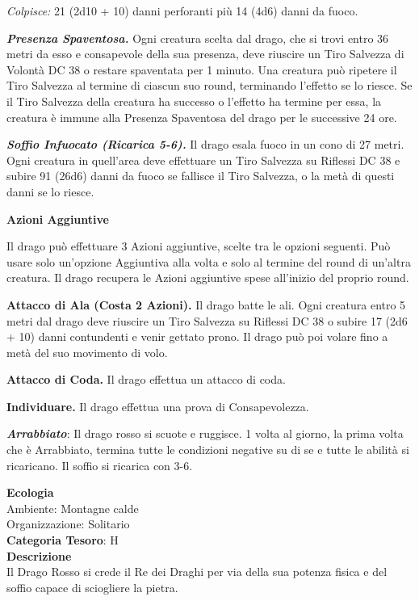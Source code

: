 \begin{multicols}{2}
{\emph{Colpisce:} 21 (2d10 + 10) danni perforanti più 14 (4d6) danni da fuoco.

\emph{\textbf{Presenza Spaventosa.}} Ogni creatura scelta dal drago, che si trovi entro 36 metri da esso e consapevole della sua presenza, deve riuscire un Tiro Salvezza di Volontà DC 38 o restare spaventata per 1 minuto. Una creatura può ripetere il Tiro Salvezza al termine di ciascun suo round, terminando l'effetto se lo riesce. Se il Tiro Salvezza della creatura ha successo o l'effetto ha termine per essa, la creatura è immune alla Presenza Spaventosa del drago per le successive 24 ore.

\emph{\textbf{Soffio Infuocato (Ricarica 5-6).}} Il drago esala fuoco in un cono di 27 metri. Ogni creatura in quell'area deve effettuare un Tiro Salvezza su Riflessi DC 38 e subire 91 (26d6) danni da fuoco se fallisce il Tiro Salvezza, o la metà di questi danni se lo riesce.

\textbf{Azioni Aggiuntive}

Il drago può effettuare 3 Azioni aggiuntive, scelte tra le opzioni seguenti. Può usare solo un'opzione Aggiuntiva alla volta e solo al termine del round di un'altra creatura. Il drago recupera le Azioni aggiuntive spese all'inizio del proprio round.

\textbf{Attacco di Ala (Costa 2 Azioni).} Il drago batte le ali. Ogni creatura entro 5 metri dal drago deve riuscire un Tiro Salvezza su Riflessi DC 38 o subire 17 (2d6 + 10) danni contundenti e venir gettato prono. Il drago può poi volare fino a metà del suo movimento di volo.

\textbf{Attacco di Coda.} Il drago effettua un attacco di coda.

\textbf{Individuare.} Il drago effettua una prova di Consapevolezza.

\emph{\textbf{Arrabbiato}}: Il drago rosso si scuote e ruggisce. 1 volta al giorno, la prima volta che è Arrabbiato, termina tutte le condizioni negative su di se e tutte le abilità si ricaricano. Il soffio si ricarica con 3-6.

\textbf{Ecologia}\\
Ambiente: Montagne calde\\
Organizzazione: Solitario\\
\textbf{Categoria Tesoro}: H\\
\textbf{Descrizione}\\
Il Drago Rosso si crede il Re dei Draghi per via della sua potenza fisica e del soffio capace di sciogliere la pietra.

}
\end{multicols}
